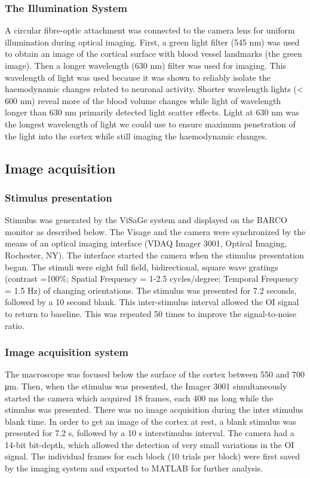 	\subsubsection{The Illumination System}
	A circular fibre-optic attachment was connected to the camera lens for uniform illumination during optical imaging. First, a green light filter (545 nm) was used to obtain an image of the cortical surface with blood vessel landmarks (the green image). Then a longer wavelength (630 nm) filter was used for imaging. This wavelength of light was used because it was shown to reliably isolate the haemodynamic changes related to neuronal activity. Shorter wavelength lights (< 600 nm) reveal more of the blood volume changes while light of wavelength longer than 630 nm primarily detected light scatter effects. Light at 630 nm was the longest wavelength of light we could use to ensure maximum penetration of the light into the cortex while still imaging the haemodynamic changes.
	
	\subsection{Image acquisition}
	
	\subsubsection{Stimulus presentation}
	
	Stimulus was generated by the ViSaGe system and displayed on the BARCO monitor as described below. The Visage and the camera were synchronized by the means of an optical imaging interface (VDAQ Imager 3001, Optical Imaging, Rochester, NY). The interface started the camera when the stimulus presentation began. The stimuli were eight full field, bidirectional, square wave gratings (contrast =100\%; Spatial Frequency = 1-2.5 cycles/degree; Temporal Frequency = 1.5 Hz) of changing orientations. The stimulus was presented for 7.2 seconds, followed by a 10 second blank. This inter-stimulus interval allowed the OI signal to return to baseline. This was repeated 50 times to improve the signal-to-noise ratio.
	
	\subsubsection{Image acquisition system}
	
	The macroscope was focused below the surface of the cortex between 550 and 700 μm. Then, when the stimulus was presented, the Imager 3001 simultaneously started the camera which acquired 18 frames, each 400 ms long while the stimulus was presented. There was no image acquisition during the inter stimulus blank time. In order to get an image of the cortex at rest, a blank stimulus was presented for 7.2 s, followed by a 10 s interstimulus interval. The camera had a 14-bit bit-depth, which allowed the detection of very small variations in the OI signal. The individual frames for each block (10 trials per block) were first saved by the imaging system and exported to MATLAB for further analysis.
	
